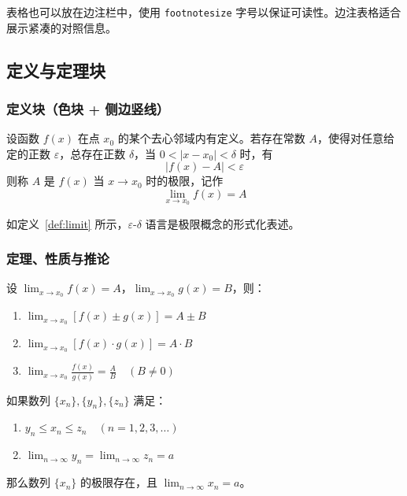 \documentclass{harryopo-mathnotes}
\begin{document}
表格也可以放在边注栏中，使用 \texttt{footnotesize} 字号以保证可读性。边注表格适合展示紧凑的对照信息。

\subsection{定义与定理块}

\subsubsection{定义块（色块 + 侧边竖线）}


\begin{formal}
\begin{definition}[函数的极限]\label{def:limit}
设函数 $f(x)$ 在点 $x_0$ 的某个去心邻域内有定义。若存在常数 $A$，使得对任意给定的正数 $\varepsilon$，总存在正数 $\delta$，当 $0<|x-x_0|<\delta$ 时，有
$$|f(x)-A|<\varepsilon$$
则称 $A$ 是 $f(x)$ 当 $x\to x_0$ 时的极限，记作
$$\lim_{x\to x_0}f(x)=A$$
\end{definition}
\end{formal}

如定义~\ref{def:limit} 所示，$\varepsilon$-$\delta$ 语言是极限概念的形式化表述。

\subsubsection{定理、性质与推论}

\begin{formal}
\begin{theorem}[极限的四则运算]\label{thm:limit-op}
设 $\displaystyle\lim_{x\to x_0}f(x)=A$，$\displaystyle\lim_{x\to x_0}g(x)=B$，则：
\begin{enumerate}
  \item $\displaystyle\lim_{x\to x_0}[f(x)\pm g(x)]=A\pm B$
  \item $\displaystyle\lim_{x\to x_0}[f(x)\cdot g(x)]=A\cdot B$
  \item $\displaystyle\lim_{x\to x_0}\frac{f(x)}{g(x)}=\frac{A}{B}\quad(B\neq 0)$
\end{enumerate}
\end{theorem}
\end{formal}

\begin{formal}
\begin{lemma}[夹逼准则]\label{lem:squeeze}
如果数列 $\{x_n\},\{y_n\},\{z_n\}$ 满足：
\begin{enumerate}
  \item $y_n\leq x_n\leq z_n\quad(n=1,2,3,\ldots)$
  \item $\displaystyle\lim_{n\to\infty}y_n=\lim_{n\to\infty}z_n=a$
\end{enumerate}
那么数列 $\{x_n\}$ 的极限存在，且 $\displaystyle\lim_{n\to\infty}x_n=a$。
\end{lemma}
\end{formal}
\end{document}
